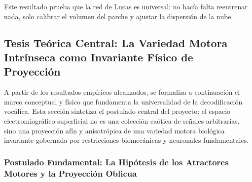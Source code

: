 \documentclass[11pt,a4paper]{article}
\begin{document}
Este resultado prueba que la red de Lucas es universal: no hacía falta reentrenar nada, solo calibrar el volumen del parche y ajustar la dispersión de la nube.

\subsection{Tesis Teórica Central: La Variedad Motora Intrínseca como Invariante Físico de Proyección}
\label{subsec:tesis_teorica_variedad_intrinseca}

A partir de los resultados empíricos alcanzados, se formaliza a continuación el marco conceptual y físico que fundamenta la universalidad de la decodificación vocálica. Esta sección sintetiza el postulado central del proyecto: el espacio electromiográfico superficial no es una colección caótica de señales arbitrarias, sino una proyección afín y anisotrópica de una variedad motora biológica invariante gobernada por restricciones biomecánicas y neuronales fundamentales.

\subsubsection{Postulado Fundamental: La Hipótesis de los Atractores Motores y la Proyección Oblicua}
\label{subsubsec:postulado_fundamental_hipotesis}
\end{document}
